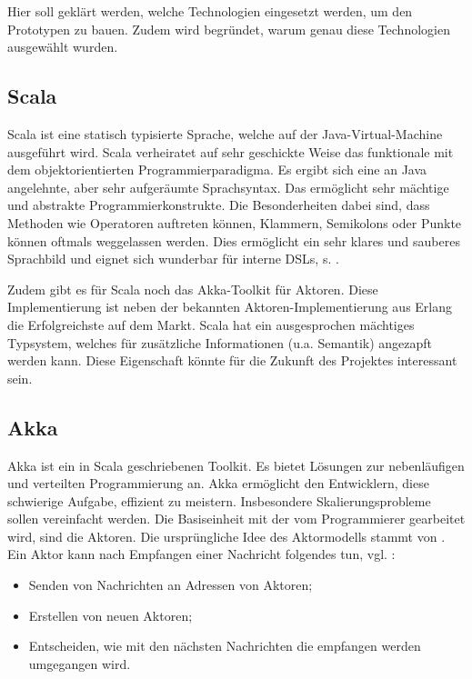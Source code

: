 Hier soll geklärt werden, welche Technologien eingesetzt werden, um den Prototypen zu bauen. Zudem wird begründet, warum genau diese Technologien ausgewählt wurden.

 
\subsection{Scala}\label{}
 
Scala ist eine statisch typisierte Sprache, welche auf der Java-Virtual-Machine ausgeführt wird. Scala verheiratet auf sehr geschickte Weise das funktionale mit dem objektorientierten Programmierparadigma. Es ergibt sich eine an Java angelehnte, aber sehr aufgeräumte Sprachsyntax. Das ermöglicht sehr mächtige und abstrakte Programmierkonstrukte. Die Besonderheiten dabei sind, dass Methoden wie Operatoren auftreten können, Klammern, Semikolons oder Punkte können oftmals weggelassen werden. Dies ermöglicht ein sehr klares und sauberes Sprachbild und eignet sich wunderbar für interne DSLs, s. \citep{Hodapp}.

 
Zudem gibt es für Scala noch das Akka-Toolkit für Aktoren. Diese Implementierung ist neben der bekannten Aktoren-Implementierung aus Erlang die Erfolgreichste auf dem Markt. Scala hat ein ausgesprochen mächtiges Typsystem, welches für zusätzliche Informationen (u.a. Semantik) angezapft werden kann. Diese Eigenschaft könnte für die Zukunft des Projektes interessant sein.

 
\subsection{Akka}\label{}
 
Akka ist ein in Scala geschriebenen Toolkit. Es bietet Lösungen zur nebenläufigen und verteilten Programmierung an. Akka ermöglicht den Entwicklern, diese schwierige Aufgabe, effizient zu meistern. Insbesondere Skalierungsprobleme sollen vereinfacht werden. Die Basiseinheit mit der vom Programmierer gearbeitet wird, sind die Aktoren. Die ursprüngliche Idee des Aktormodells stammt von \citep{Hewitt}. Ein Aktor kann nach Empfangen einer Nachricht folgendes tun, vgl. \citep{Hewitt2}:

 
\begin{itemize}

\item Senden von Nachrichten an Adressen von Aktoren;
\item Erstellen von neuen Aktoren;
\item Entscheiden, wie mit den nächsten Nachrichten die empfangen werden umgegangen wird.
\end{itemize}
 

